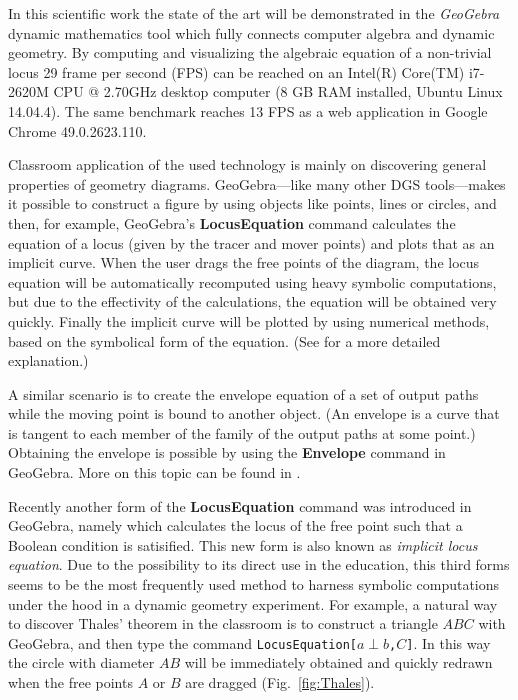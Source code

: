 \documentclass[11pt]{article}
\begin{document}
In this scientific work the state of the art will be demonstrated in the \textit{GeoGebra} dynamic mathematics tool which fully connects computer algebra and dynamic geometry. By computing and visualizing the algebraic equation of a non-trivial locus 29 frame per second (FPS) can be reached on an Intel(R) Core(TM) i7-2620M CPU @ 2.70GHz desktop computer (8 GB RAM installed, Ubuntu Linux 14.04.4). The same benchmark reaches 13 FPS as a web application in Google Chrome 49.0.2623.110.

Classroom application of the used technology is mainly on discovering general properties of geometry diagrams. GeoGebra---like many other DGS tools---makes it possible to construct a figure by using objects like points, lines or circles, and then, for example, GeoGebra's {\bf LocusEquation} command calculates the equation of a locus (given by the tracer and mover points) and plots that as an implicit curve. When the user drags the free points of the diagram, the locus equation will be automatically recomputed using heavy symbolic computations, but due to the effectivity of the calculations, the equation will be obtained very quickly. Finally the implicit curve will be plotted by using numerical methods, based on the symbolical form of the equation. (See \cite{K14} for a more detailed explanation.)

A similar scenario is to create the envelope equation of a set of output paths while the moving point is bound to another object. (An envelope is a curve that is tangent to each member of the family of the output paths at some point.) Obtaining the envelope is possible by using the {\bf Envelope} command in GeoGebra. More on this topic can be found in \cite{BR}.

Recently another form of the {\bf LocusEquation} command was introduced in GeoGebra, namely which calculates the locus of the free point such that a Boolean condition is satisified. This new form is also known as {\it implicit locus equation}. Due to the possibility to its direct use in the education, this third forms seems to be the most frequently used method to harness symbolic computations under the hood in a dynamic geometry experiment. For example, a natural way to discover Thales' theorem in the classroom is to construct a triangle $ABC$ with GeoGebra, and then type the command \texttt{LocusEquation[$a\perp b$,$C$]}. In this way the circle with diameter $AB$ will be immediately obtained and quickly redrawn when the free points $A$ or $B$ are dragged (Fig.~\ref{fig:Thales}).
\end{document}
